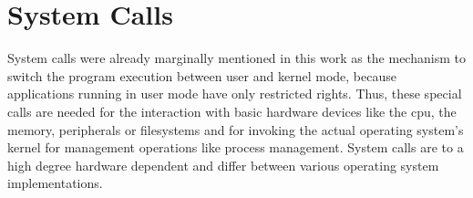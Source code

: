 \section{System Calls}\label{sec:system-calls}
System calls were already marginally mentioned in this work as the mechanism to switch the program execution between user and kernel mode, because  applications running in user mode have only restricted rights.
Thus, these special calls are needed for the interaction with basic hardware devices like the \ac{cpu}, the memory, peripherals or filesystems and for invoking the actual operating system's kernel for management operations like process management\cite{lfd430}. 
System calls are to a high degree hardware dependent and differ between various operating system implementations.
%

